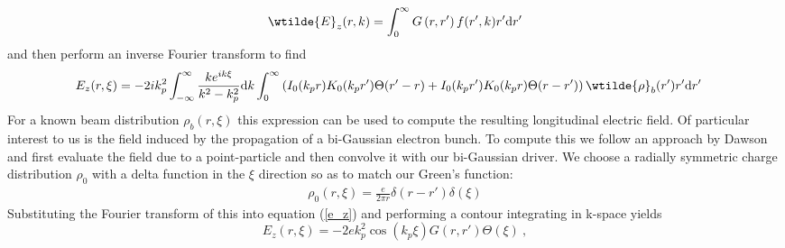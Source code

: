 \begin{equation}
\wtilde{E}_z(r,k)=\int_{0}^{\infty}G\left(r,r'\right)f(r',k)r'\mathrm{d}r'
\end{equation}
and then perform an inverse Fourier transform to find 
\begin{align}
E_z(r,\xi)&=-{2ik_p^2}\int_{-\infty}^{\infty}\frac{ke^{ik\xi}}{k^2-k_p^2}\mathrm{d}k\int_0^{\infty}\left( I_0(k_pr)K_0(k_pr')\Theta(r'-r)+I_0(k_pr')K_0(k_pr)\Theta(r-r') \right)\wtilde{\rho}_b(r')r'\mathrm{d}r'
\label{e_z}
\end{align}
For a known beam distribution $\rho_b(r,\xi)$ this expression can be used to compute the resulting longitudinal electric field. Of particular interest to us is the field induced by the propagation of a bi-Gaussian electron bunch. To compute this we follow an approach by Dawson \cite{Katsouleas1987} and first evaluate the field due to a point-particle and then convolve it with our bi-Gaussian driver. We choose a radially symmetric charge distribution ${\rho}_{0}$ with a delta function in the $\xi$ direction so as to match our Green's function:
\begin{align}
{\rho}_{0}(r,\xi)=\frac{e}{2\pi r}\delta(r-r')\delta(\xi) %
\end{align}
Substituting the Fourier transform of this into equation (\ref{e_z}) and performing a contour integrating in k-space yields 
\begin{equation}
E_z(r,\xi)=-2ek_p^2\cos(k_p\xi)G\left(r,r'\right)\Theta(\xi)~,
\label{singe-particle-wake}
\end{equation}
